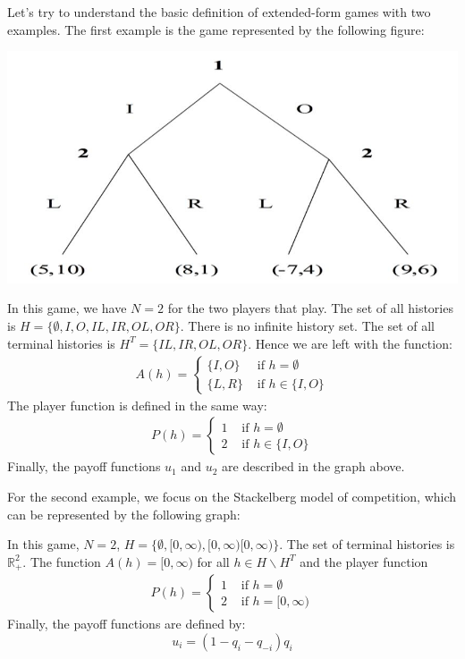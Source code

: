 \documentclass[12pt]{report}
\begin{document}
Let's try to understand the basic definition of extended-form games with two examples. The first example is the game represented by the following figure:\begin{center}
\includegraphics[scale=0.35]{images/LIORgame}
\end{center}
In this game, we have $N = 2$ for the two players that play. The set of all histories is $H = \{\emptyset, I, O, IL, IR, OL, OR\}$. There is no infinite history set. The set of all terminal histories is $H^T = \{IL, IR, OL, OR\}$. Hence we are left with the function: \begin{align*}
A(h) = \begin{cases}
\{I, O\} & \text{ if } h = \emptyset \\
\{L, R\} & \text{ if } h \in \{I,O\} 
\end{cases}
\end{align*}
The player function is defined in the same way: \begin{align*}
P(h) = \begin{cases}
1 & \text{ if } h = \emptyset \\
2 & \text{ if } h \in \{I,O\} 
\end{cases}
\end{align*}
Finally, the payoff functions $u_1$ and $u_2$ are described in the graph above.

For the second example, we focus on the Stackelberg model of competition, which can be represented by the following graph:

In this game, $N=2$, $H = \{\emptyset, [0, \infty), [0, \infty)[0, \infty)\}$. The set of terminal histories is $\mathbb{R}_+^2$. The function $A(h) = [0,\infty	)$ for all $h\in H\backslash H^T$ and the player function \begin{align*}
P(h) = \begin{cases}
1 & \text{ if } h = \emptyset \\
2 & \text{ if } h = [0, \infty) 
\end{cases}
\end{align*}
Finally, the payoff functions are defined by: $$u_i = (1 - q_i - q_{-i})q_i $$
\end{document}
